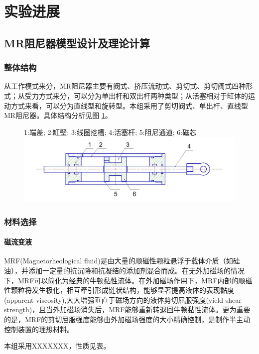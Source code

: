 \section{实验进展}
\subsection{MR阻尼器模型设计及理论计算}
\subsubsection{整体结构}
从工作模式来分，MR阻尼器主要有阀式、挤压流动式、剪切式、剪切阀式四种形式；从受力方式来分，可以分为单出杆和双出杆两种类型；从活塞相对于缸体的运动方式来看，可以分为直线型和旋转型。本组采用了剪切阀式、单出杆、直线型MR阻尼器。具体结构分析见图 \ref{mrdamper}。

\begin{figure}[H]
	\centering
		{1:端盖; 2:缸壁; 3:线圈挖槽; 4:活塞杆; 5:阻尼通道; 6:磁芯}
		\label{mrdamper}
	\includegraphics[width=6in]{figure/mrdamper}
\end{figure}

\subsubsection{材料选择}
\paragraph{磁流变液}
MRF(Magnetorheological fluid)是由大量的顺磁性颗粒悬浮于载体介质（如硅油），并添加一定量的抗沉降和抗凝结的添加剂混合而成。在无外加磁场的情况下，MRF可以简化为经典的牛顿黏性流体。在外加磁场作用下，MRF内部的顺磁性颗粒将发生极化，相互牵引形成链状结构，能够显著提高液体的表现黏度(apparent viscosity),大大增强垂直于磁场方向的液体剪切屈服强度(yield shear strength)，且当外加磁场消失后，MRF能够重新转退回牛顿黏性流体。更为重要的是，MRF的剪切屈服强度能够由外加磁场强度的大小精确控制，是制作半主动控制装置的理想材料。

本组采用XXXXXXX，性质见表。

